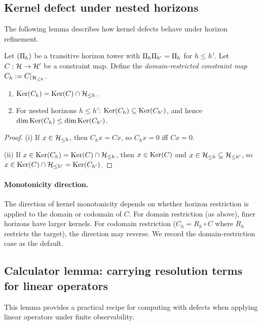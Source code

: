 \subsection{Kernel defect under nested horizons}

The following lemma describes how kernel defects behave under horizon refinement.

\begin{lemma}
\label{lem:kernel-monotonicity}
Let $(\Pi_{h})$ be a transitive horizon tower with $\Pi_{h} \Pi_{h'} = \Pi_{h}$ for $h \le h'$.
Let $C:\mathcal{H} \to \mathcal{H}'$ be a constraint map.
Define the \emph{domain-restricted constraint map} $C_h := C|_{\mathcal{H}_{\le h}}$.
\begin{enumerate}[label=(\roman*)]
\item $\mathrm{Ker}(C_h) = \mathrm{Ker}(C) \cap \mathcal{H}_{\le h}$.
\item For nested horizons $h \le h'$: $\mathrm{Ker}(C_h) \subseteq \mathrm{Ker}(C_{h'})$, and hence $\dim\mathrm{Ker}(C_h) \le \dim\mathrm{Ker}(C_{h'})$.
\end{enumerate}
\end{lemma}

\begin{proof}
(i) If $x \in \mathcal{H}_{\le h}$, then $C_h x = C x$, so $C_h x = 0$ iff $C x = 0$.

(ii) If $x \in \mathrm{Ker}(C_h) = \mathrm{Ker}(C) \cap \mathcal{H}_{\le h}$, then $x \in \mathrm{Ker}(C)$ and $x \in \mathcal{H}_{\le h} \subseteq \mathcal{H}_{\le h'}$, so $x \in \mathrm{Ker}(C) \cap \mathcal{H}_{\le h'} = \mathrm{Ker}(C_{h'})$.
\end{proof}

\paragraph{Monotonicity direction.}
The direction of kernel monotonicity depends on whether horizon restriction is applied to the domain or codomain of $C$.
For domain restriction (as above), finer horizons have larger kernels.
For codomain restriction ($C_h = R_h \circ C$ where $R_h$ restricts the target), the direction may reverse.
We record the domain-restriction case as the default.

\subsection{Calculator lemma: carrying resolution terms for linear operators}
\label{subsec:calculator-lemma}

This lemma provides a practical recipe for computing with defects when applying linear operators under finite observability.

